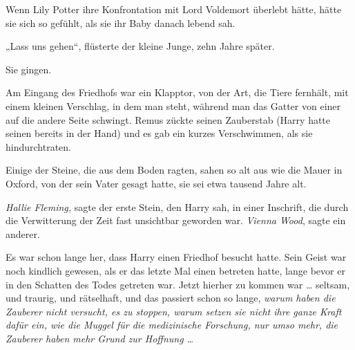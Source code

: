 Wenn Lily Potter ihre Konfrontation mit Lord Voldemort überlebt hätte, hätte sie sich so gefühlt, als sie ihr Baby danach lebend sah.

„Lass uns gehen“, flüsterte der kleine Junge, zehn Jahre später.

Sie gingen.

Am Eingang des Friedhofs war ein Klapptor, von der Art, die Tiere fernhält, mit einem kleinen Verschlag, in dem man steht, während man das Gatter von einer auf die andere Seite schwingt. Remus zückte seinen Zauberstab (Harry hatte seinen bereits in der Hand) und es gab ein kurzes Verschwimmen, als sie hindurchtraten.

Einige der Steine, die aus dem Boden ragten, sahen so alt aus wie die Mauer in Oxford, von der sein Vater gesagt hatte, sie sei etwa tausend Jahre alt.

\emph{Hallie Fleming,} sagte der erste Stein, den Harry sah, in einer Inschrift, die durch die Verwitterung der Zeit fast unsichtbar geworden war. \emph{Vienna Wood}, sagte ein anderer.

Es war schon lange her, dass Harry einen Friedhof besucht hatte. Sein Geist war noch kindlich gewesen, als er das letzte Mal einen betreten hatte, lange bevor er in den Schatten des Todes getreten war. Jetzt hierher zu kommen war … seltsam, und traurig, und rätselhaft, und das passiert schon so lange, \emph{warum haben die Zauberer nicht versucht, es zu stoppen, warum setzen sie nicht ihre ganze Kraft dafür ein, wie die Muggel für die medizinische Forschung, nur umso mehr, die Zauberer haben mehr Grund zur Hoffnung …}

